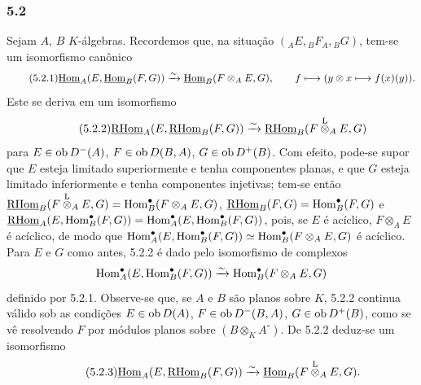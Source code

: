 \subsubsection*{5.2}

Sejam $A$, $B$ $K$-álgebras. Recordemos que, na situação $({}_AE,{}_BF_A,{}_BG)$, tem-se um isomorfismo canônico
\begin{equation}\tag{5.2.1}
\underline{\operatorname{Hom}}_A(E,\underline{\operatorname{Hom}}_B(F,G))\xrightarrow{\sim}\underline{\operatorname{Hom}}_B(F\otimes_AE,G),\qquad
f\longmapsto (y\otimes x\longmapsto f(x)(y)).
\end{equation}
Este se deriva em um isomorfismo
\begin{equation}\tag{5.2.2}
\underline{\mathrm{RHom}}_A(E,\underline{\mathrm{RHom}}_B(F,G))\xrightarrow{\sim}\underline{\mathrm{RHom}}_B(F\overset{\mathrm L}{\otimes}_AE,G)
\end{equation}
para $E\in\operatorname{ob} D^-(A)$, $F\in\operatorname{ob} D(B,A)$, $G\in\operatorname{ob} D^+(B)$. Com efeito, pode-se supor que $E$ esteja limitado superiormente e tenha componentes planas, e que $G$ esteja limitado inferiormente e tenha componentes injetivas; tem-se então $\underline{\mathrm{RHom}}_B(F\overset{\mathrm L}{\otimes}_AE,G)=\operatorname{Hom}_B^\bullet(F\otimes_AE,G)$, $\underline{\mathrm{RHom}}_B(F,G)=\operatorname{Hom}_B^\bullet(F,G)$ e $\underline{\mathrm{RHom}}_A(E,\operatorname{Hom}_B^\bullet(F,G))=\operatorname{Hom}_A^\bullet(E,\operatorname{Hom}_B^\bullet(F,G))$, pois, se $E$ é acíclico, $F\otimes_AE$ é acíclico, de modo que $\operatorname{Hom}_A^\bullet(E,\operatorname{Hom}_B^\bullet(F,G))\simeq\operatorname{Hom}_B^\bullet(F\otimes_AE,G)$ é acíclico. Para $E$ e $G$ como antes, 5.2.2 é dado pelo isomorfismo de complexos
\[
\operatorname{Hom}_A^\bullet(E,\operatorname{Hom}_B^\bullet(F,G))\xrightarrow{\sim}\operatorname{Hom}_B^\bullet(F\otimes_AE,G)
\]
definido por 5.2.1. Observe-se que, se $A$ e $B$ são planos sobre $K$, 5.2.2 continua válido sob as condições $E\in\operatorname{ob} D(A)$, $F\in\operatorname{ob} D^-(B,A)$, $G\in\operatorname{ob} D^+(B)$, como se vê resolvendo $F$ por módulos planos sobre $(B\otimes_KA^\circ)$. De 5.2.2 deduz-se um isomorfismo
\begin{equation}\tag{5.2.3}
\underline{\operatorname{Hom}}_A(E,\underline{\mathrm{RHom}}_B(F,G))\xrightarrow{\sim}\underline{\operatorname{Hom}}_B(F\overset{\mathrm L}{\otimes}_AE,G).
\end{equation}
